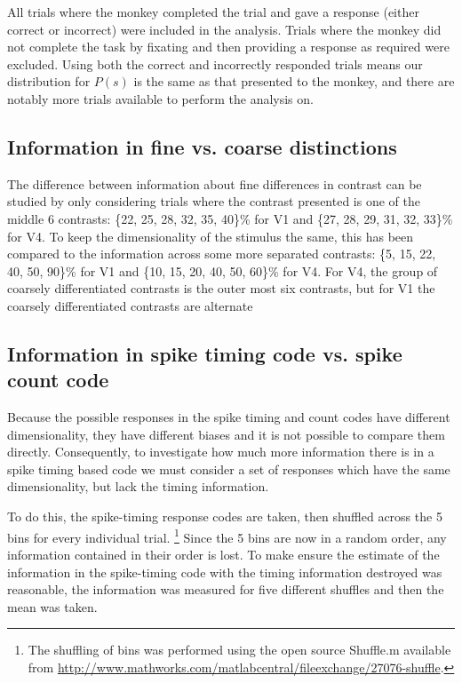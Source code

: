 All trials where the monkey completed the trial and gave a response (either correct or incorrect) were included in the analysis. Trials where the monkey did not complete the task by fixating and then providing a response as required were excluded.
Using both the correct and incorrectly responded trials means our distribution for $P(s)$ is the same as that presented to the monkey, and there are notably more trials available to perform the analysis on.


\FloatBarrier
\subsection{Information in fine vs. coarse distinctions}

The difference between information about fine differences in contrast can be studied by only considering trials where the contrast presented is one of the middle 6 contrasts:
\{22, 25, 28, 32, 35, 40\}\% for V1 and
\{27, 28, 29, 31, 32, 33\}\% for V4.
To keep the dimensionality of the stimulus the same, this has been compared to the information across some more separated contrasts:
 \{5, 15, 22, 40, 50, 90\}\% for V1 and
\{10, 15, 20, 40, 50, 60\}\% for V4.
For V4, the group of coarsely differentiated contrasts is the outer most six contrasts, but for V1 the coarsely differentiated contrasts are alternate

\FloatBarrier
\subsection{Information in spike timing code vs. spike count code}

Because the possible responses in the spike timing and count codes have different dimensionality, they have different biases \cite{Panzeri2007} and it is not possible to compare them directly.
Consequently, to investigate how much more information there is in a spike timing based code we must consider a set of responses which have the same dimensionality, but lack the timing information.

To do this, the spike-timing response codes are taken, then shuffled across the 5 bins for every individual trial.%
\footnote{The shuffling of bins was performed using the open source Shuffle.m
available from \url{http://www.mathworks.com/matlabcentral/fileexchange/27076-shuffle}.}
Since the 5 bins are now in a random order, any information contained in their order is lost. To make ensure the estimate of the information in the spike-timing code with the timing information destroyed was reasonable, the information was measured for five different shuffles%
 and then the mean was taken.

